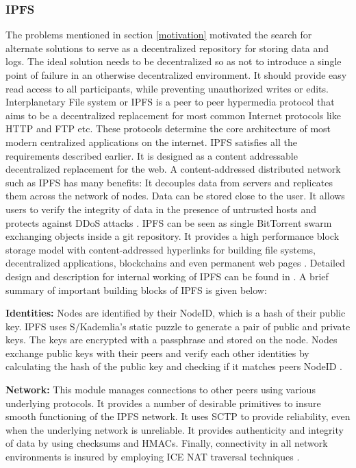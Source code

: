\subsubsection{IPFS}

The problems mentioned in section \ref{motivation} motivated the search for alternate solutions to serve as a decentralized repository for storing data and logs. The ideal solution needs to be decentralized so as not to introduce a single point of failure in an otherwise decentralized environment. It should provide easy read access to all participants, while preventing unauthorized writes or edits. Interplanetary File system or IPFS \cite{DBLP:journals/corr/Benet14} is a peer to peer hypermedia protocol that aims to be a decentralized replacement for most common Internet protocols like HTTP and FTP etc. These protocols determine the core architecture of most modern centralized applications on the internet. IPFS satisfies all the requirements described earlier.  It is designed as a content addressable decentralized replacement for the web. A content-addressed distributed network such as IPFS has many benefits: It decouples data from servers and replicates them across the network of nodes. Data can be stored close to the user. It allows users to verify the integrity of data in the presence of untrusted hosts and protects against DDoS attacks \cite{DBLP:journals/corr/Benet14}. IPFS can be seen as single BitTorrent swarm exchanging objects inside a git repository. It provides a high performance block storage model with content-addressed hyperlinks for building file systems, decentralized applications, blockchains and even permanent web pages \cite{DBLP:journals/corr/Benet14}. Detailed design and description for internal working of IPFS can be found in \cite{DBLP:journals/corr/Benet14}. A brief summary of important building blocks of IPFS is given below:

\textbf{Identities:} Nodes are identified by their NodeID, which is a hash of their public key. IPFS uses S/Kademlia’s static puzzle to generate a pair of public and private keys. The keys are encrypted with a passphrase and stored on the node. Nodes exchange public keys with their peers and verify each other identities by calculating the hash of the public key and checking if it matches peers NodeID \cite{DBLP:journals/corr/Benet14}.

\textbf{Network:} This module manages connections to other peers using various underlying protocols. It provides a number of desirable primitives to insure smooth functioning of the IPFS network. It uses SCTP to provide reliability, even when the underlying network is unreliable. It provides authenticity and integrity of data by using checksums and HMACs. Finally, connectivity in all network environments is insured by employing ICE NAT traversal techniques \cite{DBLP:journals/corr/Benet14}.

